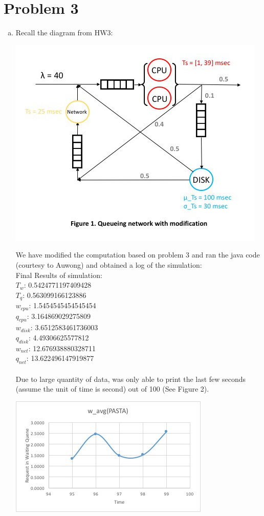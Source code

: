 \documentclass{article}   	                         %
\begin{document}
\section*{Problem 3}
\begin{enumerate}[(a)]
\item
Recall the diagram from HW3:\\
\begin{center}
\includegraphics[scale = 0.5]{Figure1.jpg}
\end{center}
We have modified the computation based on problem 3 and ran the java code (courtesy to Auwong) and obtained a log of the simulation:\\
Final Results of simulation: \\
$T_w$: 0.5424771197409428\\
$T_q$: 0.563099166123886\\
$w_{cpu}$: 1.5454545454545454\\
$q_{cpu}$: 3.164869029275809\\
$w_{disk}$: 3.6512583461736003\\
$q_{disk}$: 4.49306625577812\\
$w_{net}$: 12.676938880328711\\
$q_{net}$: 13.622496147919877\\
\\	
Due to large quantity of data, was only able to print the last few seconds (assume the unit of time is second) out of 100 (See Figure 2).\\
\begin{center}
\includegraphics[scale = 0.5]{Figure2.jpg}
\end{center}


\end{enumerate}
\end{document}
